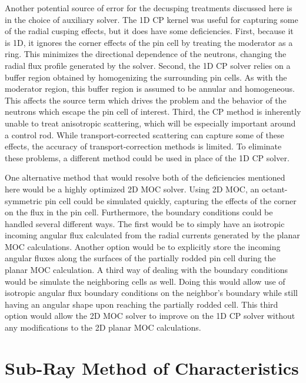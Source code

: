 Another potential source of error for the decusping treatments discussed here is in the choice of auxiliary solver.  The 1D CP kernel was useful for capturing some of the radial cusping effects, but it does have some deficiencies.  First, because it is 1D, it ignores the corner effects of the pin cell by treating the moderator as a ring.  This minimizes the directional dependence of the neutrons, changing the radial flux profile generated by the solver.  Second, the 1D CP solver relies on a buffer region obtained by homogenizing the surrounding pin cells.  As with the moderator region, this buffer region is assumed to be annular and homogeneous.  This affects the source term which drives the problem and the behavior of the neutrons which escape the pin cell of interest.  Third, the CP method is inherently unable to treat anisotropic scattering, which will be especially important around a control rod.  While transport-corrected scattering can capture some of these effects, the accuracy of transport-correction methods is limited.  To eliminate these problems, a different method could be used in place of the 1D CP solver.  

One alternative method that would resolve both of the deficiencies mentioned here would be a highly optimized 2D MOC solver.  Using 2D MOC, an octant-symmetric pin cell could be simulated quickly, capturing the effects of the corner on the flux in the pin cell.  Furthermore, the boundary conditions could be handled several different ways.  The first would be to simply have an isotropic incoming angular flux calculated from the radial currents generated by the planar MOC calculations.  Another option would be to explicitly store the incoming angular fluxes along the surfaces of the partially rodded pin cell during the planar MOC calculation.  A third way of dealing with the boundary conditions would be simulate the neighboring cells as well.  Doing this would allow use of isotropic angular flux boundary conditions on the neighbor's boundary while still having an angular shape upon reaching the partially rodded cell.  This third option would allow the 2D MOC solver to improve on the 1D CP solver without any modifications to the 2D planar MOC calculations.

\section{Sub-Ray Method of Characteristics}

